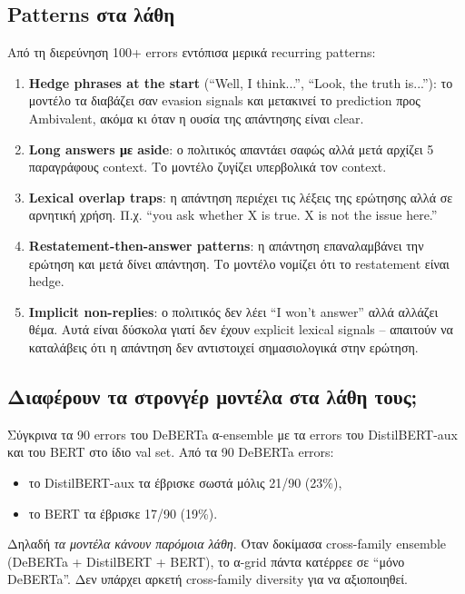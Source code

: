 \documentclass[12pt]{fphw}
\begin{document}
\subsection{Patterns στα λάθη}

Από τη διερεύνηση 100+ errors εντόπισα μερικά recurring patterns:

\begin{enumerate}
    \item \textbf{Hedge phrases at the start} (``Well, I think...'', ``Look, the truth is...''): το μοντέλο τα διαβάζει σαν evasion signals και μετακινεί το prediction προς Ambivalent, ακόμα κι όταν η ουσία της απάντησης είναι clear.
    \item \textbf{Long answers με aside}: ο πολιτικός απαντάει σαφώς αλλά μετά αρχίζει 5 παραγράφους context. Το μοντέλο ζυγίζει υπερβολικά τον context.
    \item \textbf{Lexical overlap traps}: η απάντηση περιέχει τις λέξεις της ερώτησης αλλά σε αρνητική χρήση. Π.χ. ``you ask whether X is true. X is not the issue here.''
    \item \textbf{Restatement-then-answer patterns}: η απάντηση επαναλαμβάνει την ερώτηση και μετά δίνει απάντηση. Το μοντέλο νομίζει ότι το restatement είναι hedge.
    \item \textbf{Implicit non-replies}: ο πολιτικός δεν λέει ``I won't answer'' αλλά αλλάζει θέμα. Αυτά είναι δύσκολα γιατί δεν έχουν explicit lexical signals -- απαιτούν να καταλάβεις ότι η απάντηση δεν αντιστοιχεί σημασιολογικά στην ερώτηση.
\end{enumerate}

\subsection{Διαφέρουν τα στρονγέρ μοντέλα στα λάθη τους;}

Σύγκρινα τα 90 errors του DeBERTa α-ensemble με τα errors του DistilBERT-aux και του BERT στο ίδιο val set. Από τα 90 DeBERTa errors:
\begin{itemize}
    \item το DistilBERT-aux τα έβρισκε σωστά μόλις 21/90 (23\%),
    \item το BERT τα έβρισκε 17/90 (19\%).
\end{itemize}
Δηλαδή \emph{τα μοντέλα κάνουν παρόμοια λάθη}. Όταν δοκίμασα cross-family ensemble (DeBERTa + DistilBERT + BERT), το α-grid πάντα κατέρρεε σε ``μόνο DeBERTa''. Δεν υπάρχει αρκετή cross-family diversity για να αξιοποιηθεί.
\end{document}
